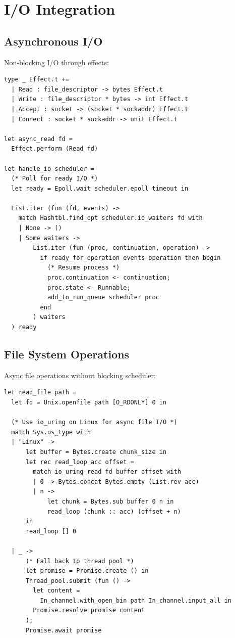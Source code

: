 \documentclass[12pt,a4paper]{report}
\begin{document}
\section{I/O Integration}

\subsection{Asynchronous I/O}

Non-blocking I/O through effects:

\begin{lstlisting}
type _ Effect.t +=
  | Read : file_descriptor -> bytes Effect.t
  | Write : file_descriptor * bytes -> int Effect.t
  | Accept : socket -> (socket * sockaddr) Effect.t
  | Connect : socket * sockaddr -> unit Effect.t

let async_read fd =
  Effect.perform (Read fd)

let handle_io scheduler =
  (* Poll for ready I/O *)
  let ready = Epoll.wait scheduler.epoll timeout in
  
  List.iter (fun (fd, events) ->
    match Hashtbl.find_opt scheduler.io_waiters fd with
    | None -> ()
    | Some waiters ->
        List.iter (fun (proc, continuation, operation) ->
          if ready_for_operation events operation then begin
            (* Resume process *)
            proc.continuation <- continuation;
            proc.state <- Runnable;
            add_to_run_queue scheduler proc
          end
        ) waiters
  ) ready
\end{lstlisting}

\subsection{File System Operations}

Async file operations without blocking scheduler:

\begin{lstlisting}
let read_file path =
  let fd = Unix.openfile path [O_RDONLY] 0 in
  
  (* Use io_uring on Linux for async file I/O *)
  match Sys.os_type with
  | "Linux" ->
      let buffer = Bytes.create chunk_size in
      let rec read_loop acc offset =
        match io_uring_read fd buffer offset with
        | 0 -> Bytes.concat Bytes.empty (List.rev acc)
        | n ->
            let chunk = Bytes.sub buffer 0 n in
            read_loop (chunk :: acc) (offset + n)
      in
      read_loop [] 0
  
  | _ ->
      (* Fall back to thread pool *)
      let promise = Promise.create () in
      Thread_pool.submit (fun () ->
        let content = 
          In_channel.with_open_bin path In_channel.input_all in
        Promise.resolve promise content
      );
      Promise.await promise
\end{lstlisting}
\end{document}
